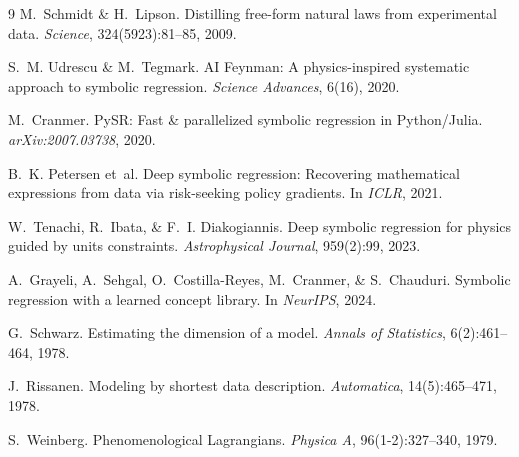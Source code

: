 \documentclass{article}
\begin{document}

\begin{thebibliography}{9}
\scriptsize
\setlength{\itemsep}{0pt}
M.~Schmidt \& H.~Lipson.
\newblock Distilling free-form natural laws from experimental data.
\newblock \emph{Science}, 324(5923):81--85, 2009.

S.~M. Udrescu \& M.~Tegmark.
\newblock AI Feynman: A physics-inspired systematic approach to symbolic regression.
\newblock \emph{Science Advances}, 6(16), 2020.

M.~Cranmer.
\newblock PySR: Fast \& parallelized symbolic regression in Python/Julia.
\newblock \emph{arXiv:2007.03738}, 2020.

B.~K. Petersen et~al.
\newblock Deep symbolic regression: Recovering mathematical expressions from data via risk-seeking policy gradients.
\newblock In \emph{ICLR}, 2021.

W.~Tenachi, R.~Ibata, \& F.~I. Diakogiannis.
\newblock Deep symbolic regression for physics guided by units constraints.
\newblock \emph{Astrophysical Journal}, 959(2):99, 2023.

A.~Grayeli, A.~Sehgal, O.~Costilla-Reyes, M.~Cranmer, \& S.~Chauduri.
\newblock Symbolic regression with a learned concept library.
\newblock In \emph{NeurIPS}, 2024.

G.~Schwarz.
\newblock Estimating the dimension of a model.
\newblock \emph{Annals of Statistics}, 6(2):461--464, 1978.

J.~Rissanen.
\newblock Modeling by shortest data description.
\newblock \emph{Automatica}, 14(5):465--471, 1978.

S.~Weinberg.
\newblock Phenomenological Lagrangians.
\newblock \emph{Physica A}, 96(1-2):327--340, 1979.
\end{thebibliography}
\end{document}
